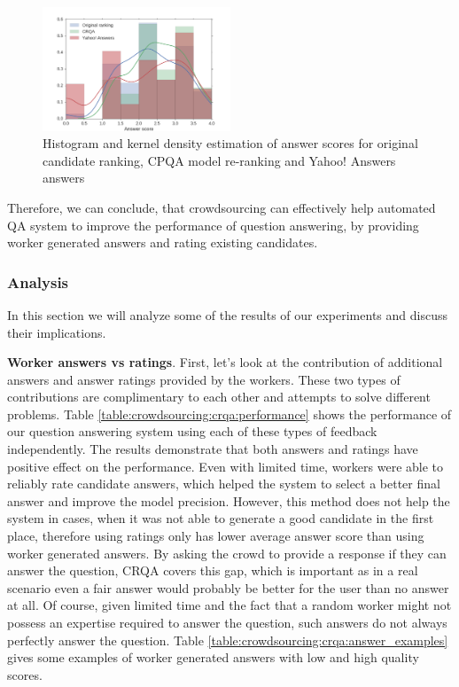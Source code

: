 \begin{figure}[h]
	\centering
	\includegraphics[width=0.5\textwidth]{img/crqa_score_hist}
	\caption{Histogram and kernel density estimation of answer scores for original candidate ranking, CPQA model re-ranking and Yahoo! Answers answers}
	\label{figure:crowdsourcing:crqa:score_histogram}
\end{figure}

Therefore, we can conclude, that crowdsourcing can effectively help automated QA system to improve the performance of question answering, by providing worker generated answers and rating existing candidates.

\subsubsection{Analysis}
\label{section:crowdsourcing:approach:crqa:analysis}

In this section we will analyze some of the results of our experiments and discuss their implications.

\textbf{Worker answers vs ratings}.
First, let's look at the contribution of additional answers and answer ratings provided by the workers.
These two types of contributions are complimentary to each other and attempts to solve different problems.
Table \ref{table:crowdsourcing:crqa:performance} shows the performance of our question answering system using each of these types of feedback independently.
The results demonstrate that both answers and ratings have positive effect on the performance.
Even with limited time, workers were able to reliably rate candidate answers, which helped the system to select a better final answer and improve the model precision.
However, this method does not help the system in cases, when it was not able to generate a good candidate in the first place, therefore using ratings only has lower average answer score than using worker generated answers.
By asking the crowd to provide a response if they can answer the question, CRQA covers this gap, which is important as in a real scenario even a fair answer would probably be better for the user than no answer at all.
Of course, given limited time and the fact that a random worker might not possess an expertise required to answer the question, such answers do not always perfectly answer the question.
Table \ref{table:crowdsourcing:crqa:answer_examples} gives some examples of worker generated answers with low and high quality scores.

